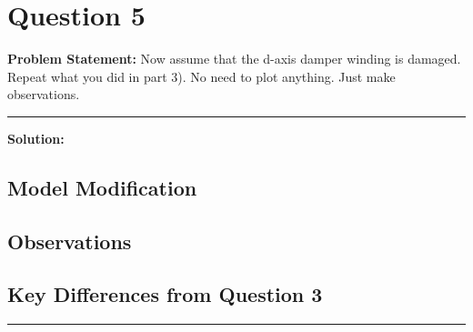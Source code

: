 \clearpage
\section*{Question 5}

\textbf{Problem Statement:} Now assume that the d-axis damper winding is damaged. Repeat what you did in part 3). No need to plot anything. Just make observations.

\vspace{1em}
\noindent\rule{\textwidth}{0.4pt}
\vspace{1em}

\textbf{Solution:}

\subsection*{Model Modification}


\subsection*{Observations}


\subsection*{Key Differences from Question 3}


\vspace{1em}
\noindent\rule{\textwidth}{0.4pt}

